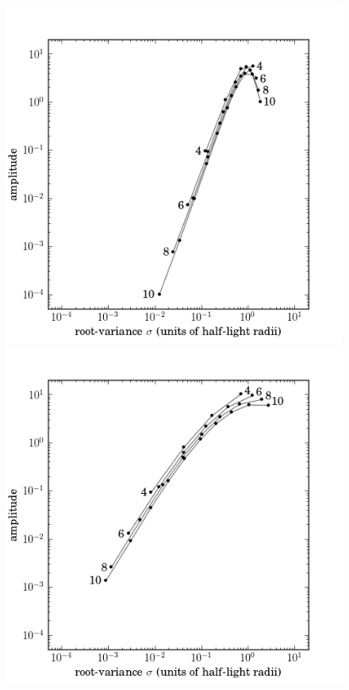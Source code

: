 \documentclass[12pt,pdftex,preprint]{aastex}
\newlength{\figurewidth}
\begin{document}
\clearpage
\begin{figure}
\includegraphics[width=\figurewidth]{mixtures_vs_K_exp.png}%
\includegraphics[width=\figurewidth]{mixtures_vs_K_dev.png}\\

\end{figure}
\end{document}
